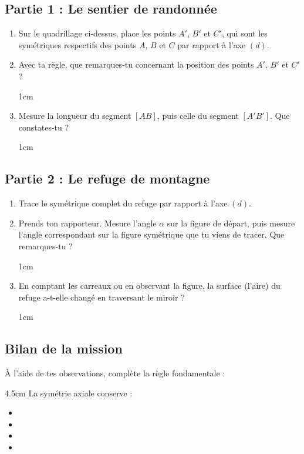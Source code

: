 \documentclass[a4paper]{book}
\begin{document}
\subsection*{Partie 1 : Le sentier de randonnée}
\begin{enumerate}
    \item Sur le quadrillage ci-dessus, place les points $A'$, $B'$ et $C'$, qui sont les symétriques respectifs des points $A$, $B$ et $C$ par rapport à l'axe $(d)$.
    \item Avec ta règle, que remarques-tu concernant la position des points $A'$, $B'$ et $C'$ ?
    \begin{ZoneReponse}{1cm}
    \end{ZoneReponse}
    \item Mesure la longueur du segment $[AB]$, puis celle du segment $[A'B']$. Que constates-tu ?
    \begin{ZoneReponse}{1cm}
    \end{ZoneReponse}
\end{enumerate}

\subsection*{Partie 2 : Le refuge de montagne}
    \begin{enumerate}
        \item Trace le symétrique complet du refuge par rapport à l'axe $(d)$. 
        \item Prends ton rapporteur. Mesure l'angle $\alpha$ sur la figure de départ, puis mesure l'angle correspondant sur la figure symétrique que tu viens de tracer. Que remarques-tu ?
        \begin{ZoneReponse}{1cm}
        \end{ZoneReponse}
        \item En comptant les carreaux ou en observant la figure, la surface (l'aire) du refuge a-t-elle changé en traversant le miroir ?
        \begin{ZoneReponse}{1cm}
        \end{ZoneReponse}
    \end{enumerate} 

\subsection*{Bilan de la mission}
    À l'aide de tes observations, complète la règle fondamentale : 
    
        \begin{ZoneReponse}{4.5cm}  
            La symétrie axiale conserve :
            \begin{itemize}[label=\textbullet]
                \item {}
                \item {}
                \item {}
                \item {}
            \end{itemize}
        \end{ZoneReponse}
\end{document}
